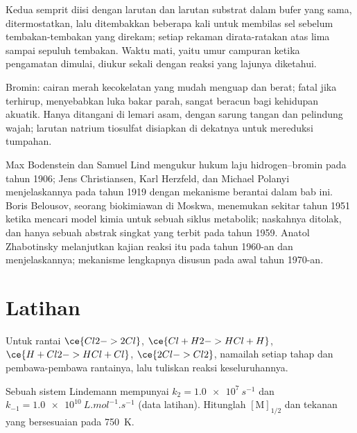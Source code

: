 \begin{inthelab}
Kedua semprit diisi dengan larutan  dan larutan substrat dalam bufer
yang sama, ditermostatkan, lalu ditembakkan beberapa kali untuk membilas sel
sebelum tembakan-tembakan yang direkam; setiap rekaman dirata-ratakan atas
lima sampai sepuluh tembakan. Waktu mati, yaitu umur campuran ketika
pengamatan dimulai, diukur sekali dengan reaksi yang lajunya diketahui.
\end{inthelab}

\begin{safety}{}
Bromin: cairan merah kecokelatan yang mudah menguap dan berat; fatal jika
terhirup, menyebabkan luka bakar parah, sangat beracun bagi kehidupan
akuatik. Hanya ditangani di lemari asam, dengan sarung tangan dan pelindung
wajah; larutan natrium tiosulfat disiapkan di dekatnya untuk mereduksi
tumpahan.
\end{safety}

\begin{history}
Max Bodenstein dan Samuel Lind mengukur hukum laju hidrogen--bromin pada tahun
1906; Jens Christiansen, Karl Herzfeld, dan Michael Polanyi menjelaskannya pada
tahun 1919 dengan mekanisme berantai dalam bab ini. Boris Belousov, seorang
biokimiawan di Moskwa, menemukan  sekitar tahun 1951
ketika mencari model kimia untuk sebuah siklus metabolik; naskahnya ditolak,
dan hanya sebuah abstrak singkat yang terbit pada tahun 1959. Anatol
Zhabotinsky melanjutkan kajian reaksi itu pada tahun 1960-an dan
menjelaskannya; mekanisme lengkapnya disusun pada awal tahun 1970-an.
\end{history}

\section{Latihan}

\begin{exercise}[$\star$]\label{exo:b3:complex-kinetics:1}
Untuk rantai $\ce{Cl2 -> 2 Cl}$, $\ce{Cl + H2 -> HCl + H}$, $\ce{H + Cl2 -> HCl + Cl}$,
$\ce{2 Cl -> Cl2}$, namailah setiap tahap dan pembawa-pembawa rantainya, lalu
tuliskan reaksi keseluruhannya.
\end{exercise}

\begin{exercise}[$\star$]\label{exo:b3:complex-kinetics:2}
Sebuah sistem Lindemann mempunyai $k_2 = \qty{1.0e7}{s^{-1}}$ dan
$k_{-1} = \qty{1.0e10}{L.mol^{-1}.s^{-1}}$ (data latihan). Hitunglah $[\mathrm M]_{1/2}$
dan tekanan yang bersesuaian pada \qty{750}{K}.
\end{exercise}

